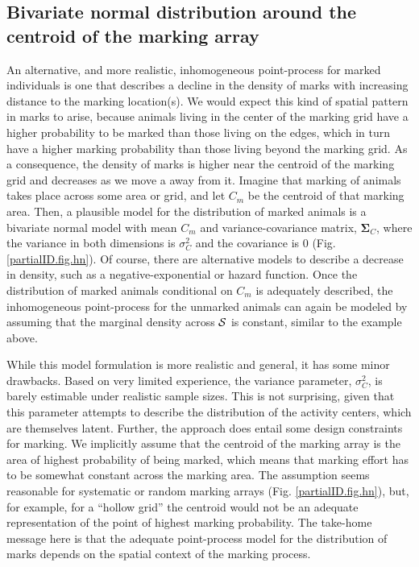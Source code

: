 \subsection{Bivariate normal distribution around the centroid of the
  marking array}
An alternative, and more realistic, inhomogeneous point-process for marked individuals is one that describes a decline in the density of marks with increasing distance to the marking location(s). We would expect this kind of spatial pattern in marks to arise, because animals living in the center of the marking grid have a higher probability to be marked than those living on the edges, which in turn have a higher marking probability than those living beyond the marking grid. As a consequence, the density of marks is higher near the centroid of the marking grid and decreases as we move a away from it. Imagine that marking of animals takes place across some area or grid, and let $C_m$ be the centroid of that marking area. Then, a plausible model for the distribution of marked animals  is a bivariate normal model with mean $C_m$ and variance-covariance matrix, ${\bm \Sigma_C}$, where the variance in both
dimensions is $\sigma_C^2$ and the covariance is 0 (Fig. \ref{partialID.fig.hn}).
Of course, there are alternative models to describe a decrease in density, such as a negative-exponential or hazard function. Once the distribution of marked animals conditional on $C_m$ is adequately described, the
inhomogeneous point-process for the unmarked animals can again be modeled by assuming that the marginal density across ${\cal S}$ is constant, similar to the example above.

While this model formulation is more realistic and general, it has some minor drawbacks. Based on very limited experience, the variance parameter, $\sigma_C^2$, is barely estimable under realistic sample sizes. This is not surprising, given that this parameter attempts to describe the distribution of the activity centers, which are themselves latent. Further, the approach does entail some design constraints for marking. We implicitly assume that the centroid of the marking array is the area of highest probability of being marked, which means that marking effort has to be somewhat constant across the marking area. The assumption seems reasonable for systematic or random marking arrays (Fig. \ref{partialID.fig.hn}), but, for example, for a ``hollow grid'' the centroid would not be an adequate representation of the point of highest marking probability.
The take-home message here is that the adequate point-process model for the distribution of marks depends on the spatial context of the marking process.

